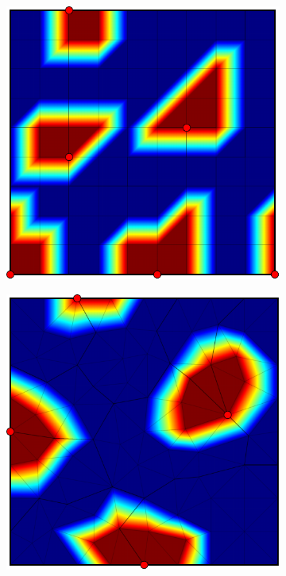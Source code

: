 \begin{figure}[htbp]
\begin{subfigure}[t]{0.3\textwidth}
  \end{subfigure}
  \hfill
  \begin{subfigure}[t]{0.3\textwidth}
    \centerline{\includegraphics[width=0.9\linewidth]{figs/square/square_cart_metis_node_init}}
  \end{subfigure}
  \hfill
  \begin{subfigure}[t]{0.3\textwidth}
    \centerline{\includegraphics[width=0.9\linewidth]{figs/square/square_tria_metis_node_init}}

\end{subfigure}
\end{figure}
